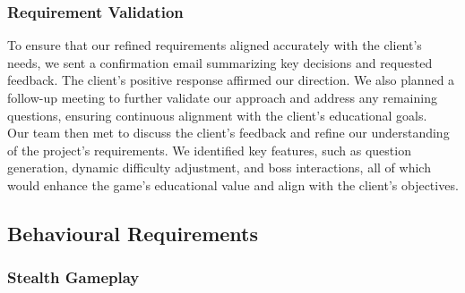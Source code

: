 \documentclass[11pt, a4paper]{article}
\begin{document}
\subsubsection{Requirement Validation}

\noindent To ensure that our refined requirements aligned accurately with the client’s needs, we sent a confirmation email summarizing key decisions and requested feedback. The client’s positive response affirmed our direction. We also planned a follow-up meeting to further validate our approach and address any remaining questions, ensuring continuous alignment with the client’s educational goals. \\

\noindent Our team then met to discuss the client’s feedback and refine our understanding of the project’s requirements. We identified key features, such as question generation, dynamic difficulty adjustment, and boss interactions, all of which would enhance the game’s educational value and align with the client’s objectives.

\newpage

\subsection{Behavioural Requirements}

\subsubsection{Stealth Gameplay}
\end{document}

